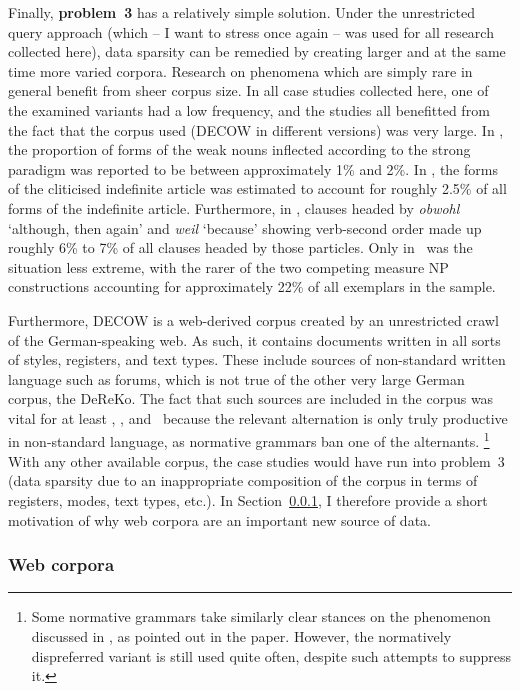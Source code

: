 Finally, \textbf{problem~3} has a relatively simple solution.
Under the unrestricted query approach (which -- I want to stress once again -- was used for all research collected here), data sparsity can be remedied by creating larger and at the same time more varied corpora.
Research on phenomena which are simply rare in general benefit from sheer corpus size.
In all case studies collected here, one of the examined variants had a low frequency, and the studies all benefitted from the fact that the corpus used (DECOW in different versions) was very large.
In \ROWeakN, the proportion of forms of the weak nouns inflected according to the strong paradigm was reported to be between approximately 1\% and 2\%.
In \RODefArt, the forms of the cliticised indefinite article was estimated to account for roughly 2.5\% of all forms of the indefinite article.
Furthermore, in \ROWeil, clauses headed by \textit{obwohl} `although, then again' and \textit{weil} `because' showing verb-second order made up roughly 6\% to 7\% of all clauses headed by those particles.
Only in \ROMeasure\ was the situation less extreme, with the rarer of the two competing measure NP constructions accounting for approximately 22\% of all exemplars in the sample.

Furthermore, DECOW is a web-derived corpus created by an unrestricted crawl of the German-speaking web.
As such, it contains documents written in all sorts of styles, registers, and text types.
These include sources of non-standard written language such as forums, which is not true of the other very large German corpus, the DeReKo.
The fact that such sources are included in the corpus was vital for at least \RODefArt, \ROWeakN,  and \ROWeil\ because the relevant alternation is only truly productive in non-standard language, as normative grammars ban one of the alternants.%
\footnote{Some normative grammars take similarly clear stances on the phenomenon discussed in \ROMeasure, as pointed out in the paper.
However, the normatively dispreferred variant is still used quite often, despite such attempts to suppress it.}
With any other available corpus, the case studies would have run into problem~3 (data sparsity due to an inappropriate composition of the corpus in terms of registers, modes, text types, etc.).
In Section~\ref{sec:webcorpora}, I therefore provide a short motivation of why web corpora are an important new source of data.

\subsubsection{Web corpora}
\label{sec:webcorpora}

